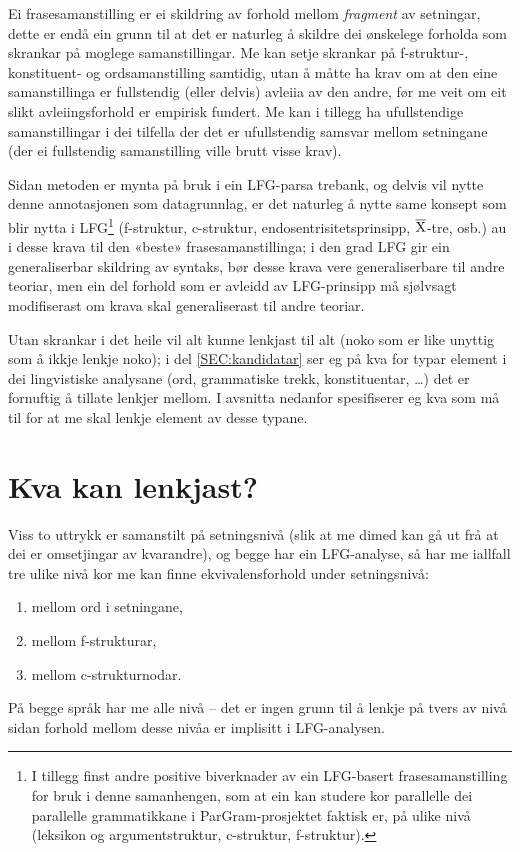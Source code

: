 \documentclass[11pt,a4paper,oneside,draft]{book}
\newcommand{\xbar}{$\rm\overline{X}$}
\begin{document}
Ei frasesamanstilling er ei skildring av forhold mellom \emph{fragment} av
setningar, dette er endå ein grunn til at det er naturleg å skildre
dei ønskelege forholda som skrankar på moglege samanstillingar. Me kan
setje skrankar på f-struktur-, konstituent- og ordsamanstilling
samtidig, utan å måtte ha krav om at den eine samanstillinga er
fullstendig (eller delvis) avleiia av den andre, før me veit om eit
slikt avleiingsforhold er empirisk fundert. Me kan i tillegg ha
ufullstendige samanstillingar i dei tilfella der det er ufullstendig
samsvar mellom setningane (der ei fullstendig samanstilling ville
brutt visse krav).

Sidan metoden er mynta på bruk i ein LFG-parsa trebank, og delvis vil
nytte denne annotasjonen som datagrunnlag, er det naturleg å nytte
same konsept som blir nytta i LFG\footnote{I tillegg finst andre positive biverknader av ein LFG-basert
       frasesamanstilling for bruk i denne samanhengen, som at ein kan
       studere kor parallelle dei parallelle grammatikkane i
       ParGram-prosjektet \citep{butt2002pgp} faktisk er, på ulike
       nivå (leksikon og argumentstruktur, c-struktur, f-struktur). } (f-struktur, c-struktur,
endosentrisitetsprinsipp, \xbar{}-tre, osb.)  au i desse krava til den
«beste» frasesamanstillinga; i den grad LFG gir ein generaliserbar
skildring av syntaks, bør desse krava vere generaliserbare til andre
teoriar, men ein del forhold som er avleidd av LFG-prinsipp må
sjølvsagt modifiserast om krava skal generaliserast til andre teoriar.

Utan skrankar i det heile vil alt kunne lenkjast til alt (noko som er
like unyttig som å ikkje lenkje noko); i del \ref{SEC:kandidatar} ser
eg på kva for typar element i dei lingvistiske analysane (ord,
grammatiske trekk, konstituentar, \ldots{}) det er fornuftig å tillate
lenkjer mellom. I avsnitta nedanfor spesifiserer eg kva som må til for
at me skal lenkje element av desse typane.

\section{Kva kan lenkjast?}
\label{sec-3.4}

\label{SEC:kandidatar}

Viss to uttrykk er samanstilt på setningsnivå (slik at me dimed kan gå
ut frå at dei er omsetjingar av kvarandre), og begge har ein
LFG-analyse, så har me iallfall tre ulike nivå kor me kan finne
ekvivalensforhold under setningsnivå:
\begin{enumerate}
\item mellom ord i setningane,
\item mellom f-strukturar,
\item mellom c-strukturnodar.
\end{enumerate}
På begge språk har me alle nivå -- det er ingen grunn til å lenkje på
tvers av nivå sidan forhold mellom desse nivåa er implisitt i
LFG-analysen.
\end{document}
